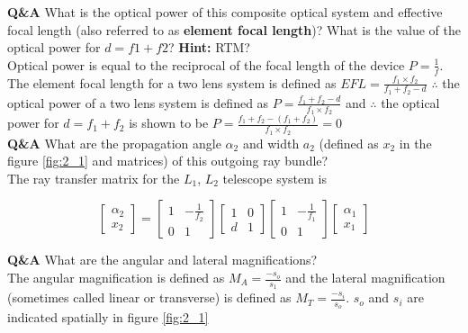 \documentclass[main.tex]{subfiles}
\begin{document}
\textbf{Q\&A} What is the optical power of this composite optical system and effective focal length (also referred to as \textbf{element focal length})? What is the value of the optical power for $d=f1+f2$? \textbf{Hint:} RTM?\\

Optical power is equal to the reciprocal of the focal length of the device $P=\frac{1}{f}$. The element focal length for a two lens system is defined as $EFL = \frac{f_1 \times f_2}{f_1 + f_2 - d}$ $\therefore$ the optical power of a two lens system is defined as $P=\frac{f_1 + f_2 -d}{f_1 \times f_2}$ and $\therefore$ the optical power for $d=f_1 + f_2$ is shown to be $P=\frac{f_1 + f_2 - (f_1 + f_2)}{f_1 \times f_2} = 0$\\

\textbf{Q\&A} What are the propagation angle $\alpha_2$ and width $a_2$ (defined as $x_2$ in the figure \ref{fig:2_1} and matrices) of this outgoing ray bundle? \\


The ray transfer matrix for the $L_1$, $L_2$ telescope system is

\begin{equation}
\begin{bmatrix}
    \alpha_2 \\
    x_2
\end{bmatrix}
=
\begin{bmatrix}
    1   & -\frac{1}{f_2} \\
    0   &   1
\end{bmatrix}
\begin{bmatrix}
    1   &   0 \\
    d   &   1
\end{bmatrix}
\begin{bmatrix}
    1   & -\frac{1}{f_1} \\
    0   &   1
\end{bmatrix}
\begin{bmatrix}
    \alpha_{1}  \\
    x_1
\end{bmatrix}
\end{equation}


\textbf{Q\&A} What are the angular and lateral magnifications?\\

The angular magnification is defined as $M_A = \frac{-s_o}{s_1}$ and the lateral magnification (sometimes called linear or transverse) is defined as $M_T = \frac{-s_i}{s_o}$. $s_o$ and $s_i$ are indicated spatially in figure \ref{fig:2_1}\\
\end{document}
